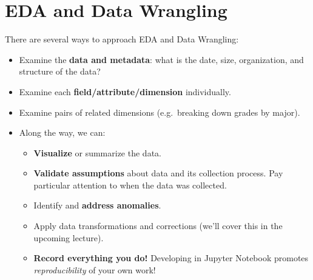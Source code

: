 \documentclass[
  letterpaper,
  DIV=11,
  numbers=noendperiod]{scrreprt}
\providecommand{\tightlist}{%
  \setlength{\itemsep}{0pt}\setlength{\parskip}{0pt}}\usepackage{longtable,booktabs,array}
\begin{document}
\hypertarget{eda-and-data-wrangling}{%
\section{EDA and Data Wrangling}\label{eda-and-data-wrangling}}

There are several ways to approach EDA and Data Wrangling:

\begin{itemize}
\tightlist
\item
  Examine the \textbf{data and metadata}: what is the date, size,
  organization, and structure of the data?
\item
  Examine each \textbf{field/attribute/dimension} individually.
\item
  Examine pairs of related dimensions (e.g.~breaking down grades by
  major).
\item
  Along the way, we can:

  \begin{itemize}
  \tightlist
  \item
    \textbf{Visualize} or summarize the data.
  \item
    \textbf{Validate assumptions} about data and its collection process.
    Pay particular attention to when the data was collected.
  \item
    Identify and \textbf{address anomalies}.
  \item
    Apply data transformations and corrections (we'll cover this in the
    upcoming lecture).
  \item
    \textbf{Record everything you do!} Developing in Jupyter Notebook
    promotes \emph{reproducibility} of your own work!
  \end{itemize}
\end{itemize}
\end{document}
